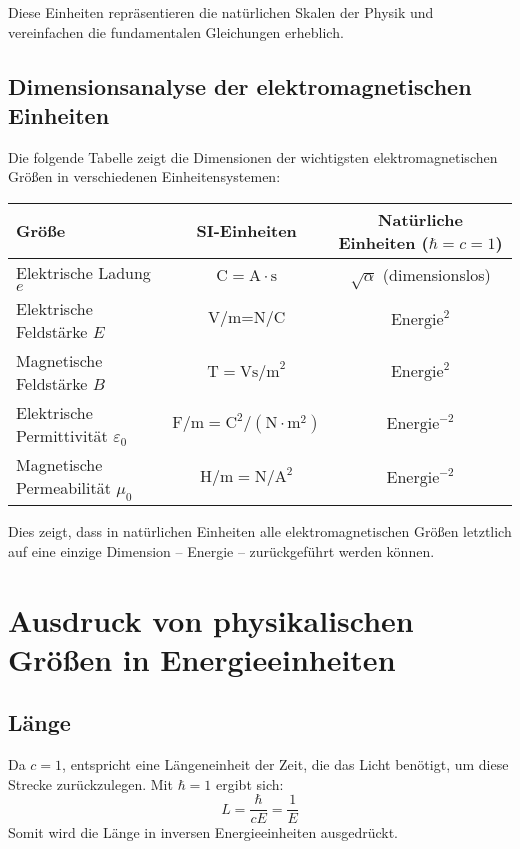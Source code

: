 \documentclass{article}
\begin{document}
Diese Einheiten repräsentieren die natürlichen Skalen der Physik und vereinfachen die fundamentalen Gleichungen erheblich.

\subsection{Dimensionsanalyse der elektromagnetischen Einheiten}

Die folgende Tabelle zeigt die Dimensionen der wichtigsten elektromagnetischen Größen in verschiedenen Einheitensystemen:

\begin{center}
	\begin{tabular}{|l|c|c|}
		\hline
		\textbf{Größe} & \textbf{SI-Einheiten} & \textbf{Natürliche Einheiten} ($\hbar = c = 1$) \\
		\hline
		Elektrische Ladung $e$ & $\text{C} = \text{A} \cdot \text{s}$ & $\sqrt{\alpha}$ (dimensionslos) \\
		Elektrische Feldstärke $E$ & $\text{V/m} = \text{N/C}$ & $\text{Energie}^2$ \\
		Magnetische Feldstärke $B$ & $\text{T} = \text{Vs/m}^2$ & $\text{Energie}^2$ \\
		Elektrische Permittivität $\varepsilon_0$ & $\text{F/m} = \text{C}^2/(\text{N} \cdot \text{m}^2)$ & $\text{Energie}^{-2}$ \\
		Magnetische Permeabilität $\mu_0$ & $\text{H/m} = \text{N}/\text{A}^2$ & $\text{Energie}^{-2}$ \\
		\hline
	\end{tabular}
\end{center}

Dies zeigt, dass in natürlichen Einheiten alle elektromagnetischen Größen letztlich auf eine einzige Dimension – Energie – zurückgeführt werden können.


\section{Ausdruck von physikalischen Größen in Energieeinheiten}

\subsection{Länge}
Da $c=1$, entspricht eine Längeneinheit der Zeit, die das Licht benötigt, um diese Strecke zurückzulegen. Mit $\hbar=1$ ergibt sich:
\begin{equation}
	L = \frac{\hbar}{cE} = \frac{1}{E}
\end{equation}
Somit wird die Länge in inversen Energieeinheiten ausgedrückt.
\end{document}
